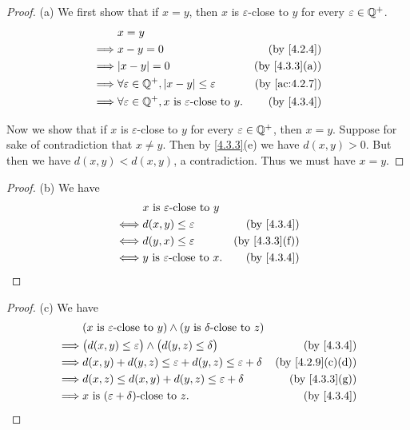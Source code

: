 \begin{proof}{(a)}
  We first show that if \(x = y\), then \(x\) is \(\varepsilon\)-close to \(y\) for every \(\varepsilon \in \mathbb{Q}^+\).
  \begin{align*}
             & x = y                                                                                                 \\
    \implies & x - y = 0                                                               & \text{(by \cref{4.2.4})}    \\
    \implies & \abs{x - y} = 0                                                         & \text{(by \cref{4.3.3}(a))} \\
    \implies & \forall \varepsilon \in \Q^+, \abs{x - y} \leq \varepsilon              & \text{(by \cref{ac:4.2.7})} \\
    \implies & \forall \varepsilon \in \Q^+, x \text{ is \(\varepsilon\)-close to } y. & \text{(by \cref{4.3.4})}
  \end{align*}

  Now we show that if \(x\) is \(\varepsilon\)-close to \(y\) for every \(\varepsilon \in \mathbb{Q}^+\), then \(x = y\).
  Suppose for sake of contradiction that \(x \neq y\).
  Then by \cref{4.3.3}(e) we have \(d(x, y) > 0\).
  But then we have \(d(x, y) < d(x, y)\), a contradiction.
  Thus we must have \(x = y\).
\end{proof}

\begin{proof}{(b)}
  We have
  \begin{align*}
         & x \text{ is \(\varepsilon\)-close to } y                                \\
    \iff & d(x, y) \leq \varepsilon                  & \text{(by \cref{4.3.4})}    \\
    \iff & d(y, x) \leq \varepsilon                  & \text{(by \cref{4.3.3}(f))} \\
    \iff & y \text{ is \(\varepsilon\)-close to } x. & \text{(by \cref{4.3.4})}
  \end{align*}
\end{proof}

\begin{proof}{(c)}
  We have
  \begin{align*}
             & (x \text{ is \(\varepsilon\)-close to } y) \land (y \text{ is \(\delta\)-close to } z)                                  \\
    \implies & \big(d(x, y) \leq \varepsilon\big) \land \big(d(y, z) \leq \delta\big)                 & \text{(by \cref{4.3.4})}       \\
    \implies & d(x, y) + d(y, z) \leq \varepsilon + d(y, z) \leq \varepsilon + \delta                 & \text{(by \cref{4.2.9}(c)(d))} \\
    \implies & d(x, z) \leq d(x, y) + d(y, z) \leq \varepsilon + \delta                               & \text{(by \cref{4.3.3}(g))}    \\
    \implies & x \text{ is \((\varepsilon + \delta)\)-close to } z.                                   & \text{(by \cref{4.3.4})}
  \end{align*}
\end{proof}

